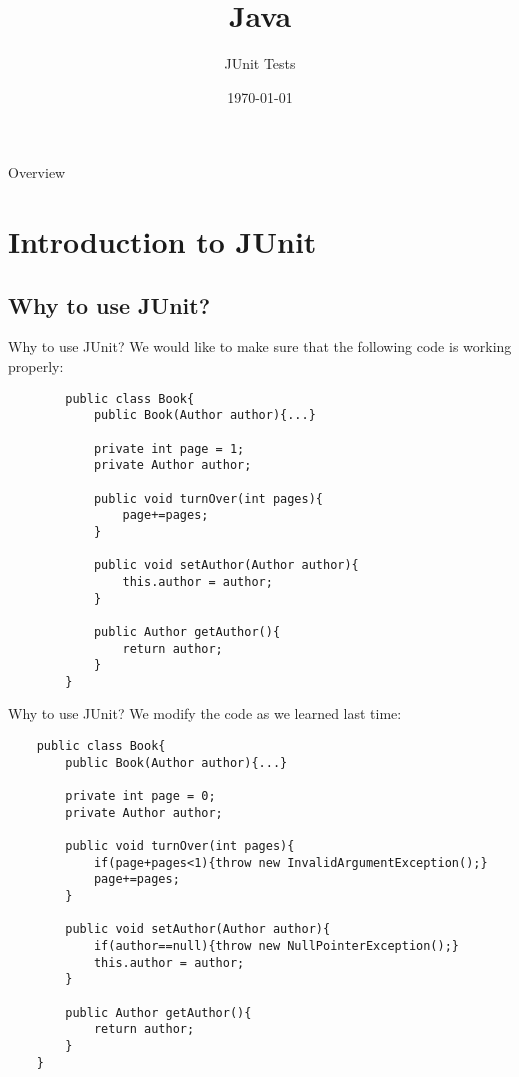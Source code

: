 


\usepackage{qtree}

\title{Java}
\subtitle{JUnit Tests}
\date{\today}

\usepackage{color}



\begin{frame}
	\titlepage
\end{frame}

\begin{frame}{Overview}
	\tableofcontents
\end{frame}

\section{Introduction to JUnit}
\subsection{Why to use JUnit?}
\begin{frame}[fragile]{Why to use JUnit?}
	We would like to make sure that the following code is working properly:\\
	\begin{lstlisting}
		public class Book{
			public Book(Author author){...}
			
			private int page = 1;
			private Author author;
			
			public void turnOver(int pages){
				page+=pages;
			}
			
			public void setAuthor(Author author){
				this.author = author;
			}
			
			public Author getAuthor(){
				return author;
			}
		}
	\end{lstlisting}
\end{frame}

\begin{frame}[fragile]{Why to use JUnit?}
	We modify the code as we learned last time:\\
	\begin{lstlisting}
	public class Book{
		public Book(Author author){...}
		
		private int page = 0;
		private Author author;
		
		public void turnOver(int pages){
			if(page+pages<1){throw new InvalidArgumentException();}
			page+=pages;
		}
		
		public void setAuthor(Author author){
			if(author==null){throw new NullPointerException();}
			this.author = author;
		}
		
		public Author getAuthor(){
			return author;
		}
	}
	\end{lstlisting}
\end{frame}

